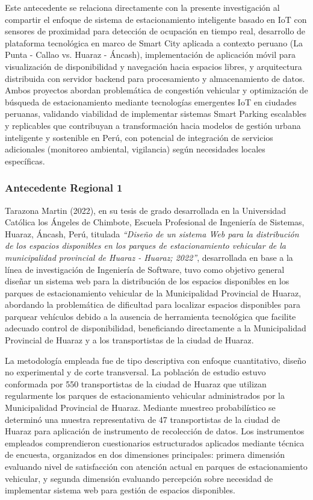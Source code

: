 \documentclass[12pt,a4paper]{article}
\begin{document}
Este antecedente se relaciona directamente con la presente investigación al compartir el enfoque de sistema de estacionamiento inteligente basado en IoT con sensores de proximidad para detección de ocupación en tiempo real, desarrollo de plataforma tecnológica en marco de Smart City aplicada a contexto peruano (La Punta - Callao vs. Huaraz - Áncash), implementación de aplicación móvil para visualización de disponibilidad y navegación hacia espacios libres, y arquitectura distribuida con servidor backend para procesamiento y almacenamiento de datos. Ambos proyectos abordan problemática de congestión vehicular y optimización de búsqueda de estacionamiento mediante tecnologías emergentes IoT en ciudades peruanas, validando viabilidad de implementar sistemas Smart Parking escalables y replicables que contribuyan a transformación hacia modelos de gestión urbana inteligente y sostenible en Perú, con potencial de integración de servicios adicionales (monitoreo ambiental, vigilancia) según necesidades locales específicas.

\subsubsection{Antecedente Regional 1}

Tarazona Martin (2022), en su tesis de grado desarrollada en la Universidad Católica los Ángeles de Chimbote, Escuela Profesional de Ingeniería de Sistemas, Huaraz, Áncash, Perú, titulada \textit{``Diseño de un sistema Web para la distribución de los espacios disponibles en los parques de estacionamiento vehicular de la municipalidad provincial de Huaraz - Huaraz; 2022''}, desarrollada en base a la línea de investigación de Ingeniería de Software, tuvo como objetivo general diseñar un sistema web para la distribución de los espacios disponibles en los parques de estacionamiento vehicular de la Municipalidad Provincial de Huaraz, abordando la problemática de dificultad para localizar espacios disponibles para parquear vehículos debido a la ausencia de herramienta tecnológica que facilite adecuado control de disponibilidad, beneficiando directamente a la Municipalidad Provincial de Huaraz y a los transportistas de la ciudad de Huaraz.

La metodología empleada fue de tipo descriptiva con enfoque cuantitativo, diseño no experimental y de corte transversal. La población de estudio estuvo conformada por 550 transportistas de la ciudad de Huaraz que utilizan regularmente los parques de estacionamiento vehicular administrados por la Municipalidad Provincial de Huaraz. Mediante muestreo probabilístico se determinó una muestra representativa de 47 transportistas de la ciudad de Huaraz para aplicación de instrumento de recolección de datos. Los instrumentos empleados comprendieron cuestionarios estructurados aplicados mediante técnica de encuesta, organizados en dos dimensiones principales: primera dimensión evaluando nivel de satisfacción con atención actual en parques de estacionamiento vehicular, y segunda dimensión evaluando percepción sobre necesidad de implementar sistema web para gestión de espacios disponibles.
\end{document}
